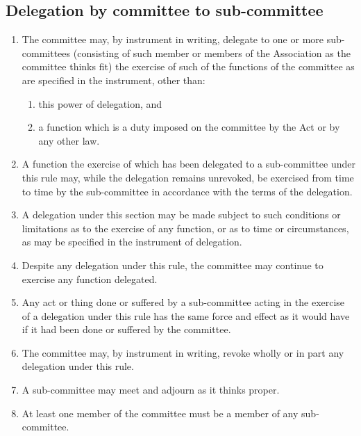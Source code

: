 \subsection{Delegation by committee to sub-committee}
\begin{enumerate}
  \item The committee may, by instrument in writing, delegate to one or more sub-committees (consisting of such member or members of the Association as the committee thinks fit) the exercise of such of the functions of the committee as are specified in the instrument, other than:
    \begin{enumerate}
      \item this power of delegation, and
      \item a function which is a duty imposed on the committee by the Act or by any other law.
    \end{enumerate}
  \item A function the exercise of which has been delegated to a sub-committee under this rule may, while the delegation remains unrevoked, be exercised from time to time by the sub-committee in accordance with the terms of the delegation.
  \item A delegation under this section may be made subject to such conditions or limitations as to the exercise of any function, or as to time or circumstances, as may be specified in the instrument of delegation.
  \item Despite any delegation under this rule, the committee may continue to exercise any function delegated.
  \item Any act or thing done or suffered by a sub-committee acting in the exercise of a delegation under this rule has the same force and effect as it would have if it had been done or suffered by the committee.
  \item The committee may, by instrument in writing, revoke wholly or in part any delegation under this rule.
  \item A sub-committee may meet and adjourn as it thinks proper.
  \item At least one member of the committee must be a member of any sub-committee.
\end{enumerate}
